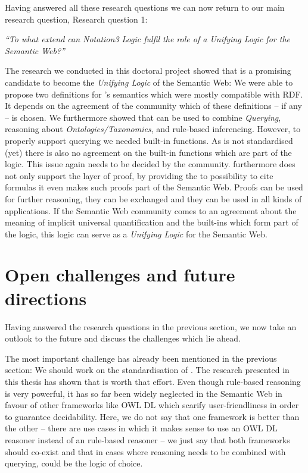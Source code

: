 Having answered all these research questions we can now return to our main research question, Research question 1:

\textit{ 
``To what extend can Notation3 Logic fulfil the role of a \emph{Unifying Logic} for the Semantic Web?''
}

The research we conducted in this doctoral project showed that \nthreelogic is a promising candidate to become the \emph{Unifying Logic} of the Semantic Web:
We were able to propose two definitions for \nthree's semantics which were mostly compatible with RDF. It depends on the agreement of the community which 
of these definitions -- if any -- is chosen.
We furthermore showed that \nthree can be used to combine \emph{Querying}, reasoning about \emph{Ontologies/Taxonomies}, and rule-based inferencing. 
However, to properly support querying we  needed 
built-in functions. As \nthree is not standardised (yet) there is also no agreement on the built-in functions which are part of the logic. This  issue again 
needs to be decided by the community. 
\nthree  furthermore does not only support the layer of proof, by providing the to possibility to cite formulas it even makes such proofs part of the Semantic Web.
Proofs can be used for further reasoning, they can be exchanged and they can be used in all kinds of applications.
If the Semantic Web community comes to an agreement about the meaning of implicit universal quantification and the built-ins which form part of the logic, this logic 
can serve as a \emph{Unifying Logic} for the Semantic Web.




\section{Open challenges and future directions}
Having answered the research questions in the previous section, we now take an outlook to the future and discuss the challenges which lie ahead. 

The most important challenge 
has already been mentioned in the previous section: We should work on the standardisation of \nthree.
The research presented in this thesis has shown that \nthree is worth that effort. 
Even though rule-based reasoning is very powerful, it has so far been widely neglected in the Semantic Web in favour of other frameworks like OWL DL which 
scarify user-friendliness in order to guarantee decidability. %
Here, we do not say that one framework is better than the other -- there are use cases in which it makes sense to use an OWL DL reasoner instead of an 
rule-based reasoner -- we just say that both frameworks should co-exist and that in cases where reasoning needs to be combined with querying, \nthree could be 
the logic of choice. 

